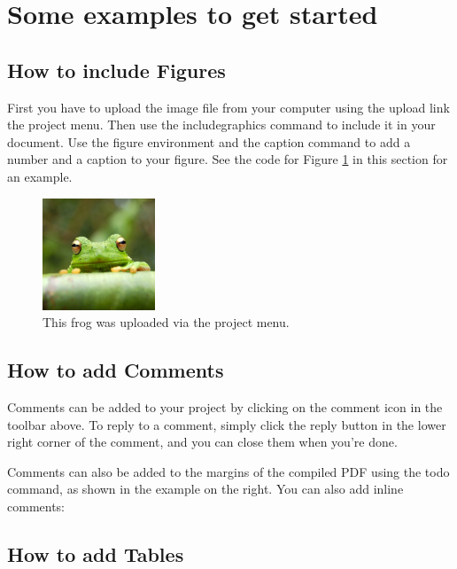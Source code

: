\documentclass[a4paper]{article}
\begin{document}
\section{Some examples to get started}

\subsection{How to include Figures}

First you have to upload the image file from your computer using the upload link the project menu. Then use the includegraphics command to include it in your document. Use the figure environment and the caption command to add a number and a caption to your figure. See the code for Figure \ref{fig:frog} in this section for an example.

\begin{figure}
\centering
\includegraphics[width=0.3\textwidth]{frog.jpg}
\caption{\label{fig:frog}This frog was uploaded via the project menu.}
\end{figure}

\subsection{How to add Comments}

Comments can be added to your project by clicking on the comment icon in the toolbar above. %
%
%
To reply to a comment, simply click the reply button in the lower right corner of the comment, and you can close them when you're done.

Comments can also be added to the margins of the compiled PDF using the todo command, as shown in the example on the right. You can also add inline comments:


\subsection{How to add Tables}
\end{document}
